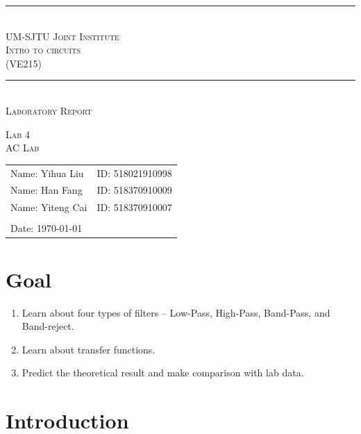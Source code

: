 \documentclass[a4paper]{report}
\begin{document}
\renewcommand\thesection{\arabic{section}}
\begin{Large}
	\begin{center}
		\setlength{\baselineskip}{14pt}
		\vspace{1.25cm}
		\rule[0cm]{11.2cm}{0.03em}\\
		\vspace{0.5cm}
		\textsc{UM-SJTU Joint Institute}\\
		\vspace{0.25cm}
		\textsc{Intro to circuits\\(VE215)}
		\vspace{0.3cm}
		\rule[0cm]{11.8cm}{0.05em}
		\vspace{4.9cm}\\
		\textsc{Laboratory Report}
	\end{center}
\end{Large}
\vspace{0.85cm}
\begin{large}
	\begin{center}
		\textsc{Lab 4}
		\vspace{1em}\\
		\textsc{AC Lab}
	\end{center}
	\vspace{6cm}
\end{large}
\begin{tabular}{l l}
	Name: Yihua Liu&ID: 518021910998\\
	Name: Han Fang&ID: 518370910009\\
	Name: Yiteng Cai&ID: 518370910007\\
	&\\
	Date: \today&\\
\end{tabular}
\thispagestyle{empty}
\newpage
\section{Goal}
\begin{enumerate}
\item
Learn about four types of filters – Low-Pass, High-Pass, Band-Pass, and Band-reject.
\item
Learn about transfer functions.
\item
Predict the theoretical result and make comparison with lab data.
\end{enumerate}
\section{Introduction}
\end{document}
